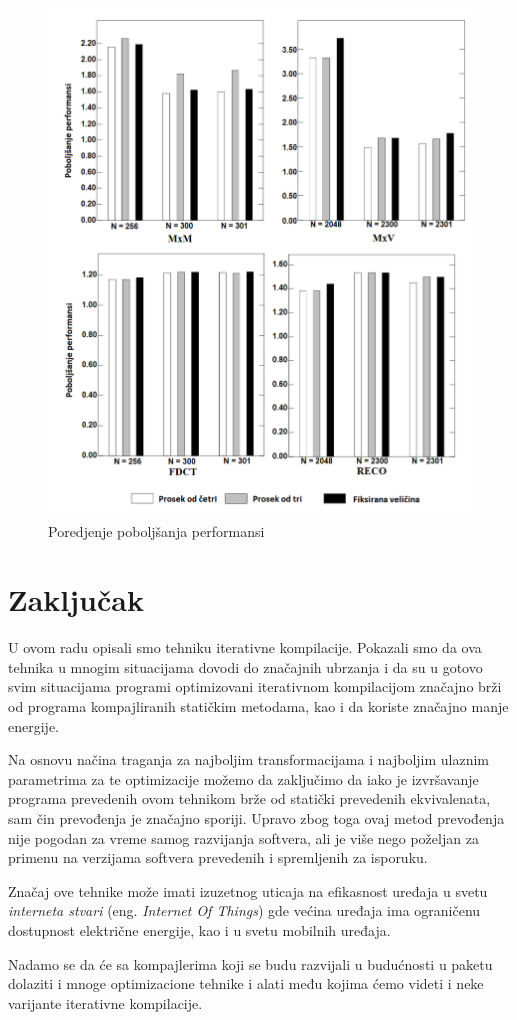 \documentclass[a4paper]{article}
\begin{document}
\begin{figure}[h]
\includegraphics[scale=0.5]{performanse3}
\caption{Poredjenje poboljšanja performansi}
\label{fig:slika4}
\end{figure}

\newpage
\section{Zaključak}
\label{sec:zakljucak}
U ovom radu opisali smo tehniku iterativne kompilacije. 
Pokazali smo da ova tehnika u mnogim situacijama dovodi 
do značajnih ubrzanja i da su u gotovo svim situacijama 
programi optimizovani iterativnom kompilacijom značajno 
brži od programa kompajliranih statičkim metodama, kao i da koriste
značajno manje energije.
\par
Na osnovu načina traganja za najboljim transformacijama 
i najboljim ulaznim parametrima za te optimizacije možemo da zaključimo
da iako je izvršavanje programa prevedenih ovom tehnikom brže
od statički prevedenih ekvivalenata, sam čin prevođenja je značajno sporiji. 
Upravo zbog toga ovaj metod prevođenja nije pogodan za vreme samog
razvijanja softvera, 
ali je više nego poželjan za primenu na verzijama softvera prevedenih 
i spremljenih za isporuku.
\par
Značaj ove tehnike može imati izuzetnog uticaja
na efikasnost uređaja u svetu \emph{interneta stvari} (eng. \emph{Internet Of Things}) 
gde većina uređaja ima ograničenu dostupnost električne energije, kao i u svetu 
mobilnih uređaja.
\par
Nadamo se da će sa kompajlerima koji se budu razvijali u budućnosti u paketu 
dolaziti i mnoge optimizacione tehnike i alati među kojima ćemo videti i
neke varijante iterativne kompilacije.
\appendix
 

\end{document}
